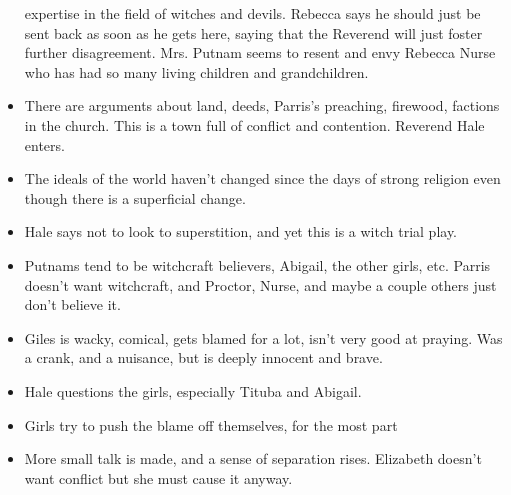 \documentclass[10pt]{article}
\begin{document}
\begin{itemize}
		expertise in the field of witches and devils.  Rebecca says he
		should just be sent back as soon as he gets here, saying that the
		Reverend will just foster further disagreement.  Mrs. Putnam seems
		to resent and envy Rebecca Nurse who has had so many living children
		and grandchildren.
	\item There are arguments about land, deeds, Parris's preaching,
		firewood, factions in the church.  This is a town full of conflict
		and contention.  Reverend Hale enters.
	\item The ideals of the world haven't changed since the days of strong
		religion even though there is a superficial change.
	\item Hale says not to look to superstition, and yet this is a witch
		trial play.
	\item Putnams tend to be witchcraft believers, Abigail, the other girls,
		etc.  Parris doesn't want witchcraft, and Proctor, Nurse, and maybe
		a couple others just don't believe it.
	\item Giles is wacky, comical, gets blamed for a lot, isn't very good
		at praying.  Was a crank, and a nuisance, but is deeply innocent and
		brave.
	\item Hale questions the girls, especially Tituba and Abigail.  
	\item Girls try to push the blame off themselves, for the most part
	\item More small talk is made, and a sense of separation rises.  
		Elizabeth doesn't want conflict but she must cause it anyway.
\end{itemize}
\end{document}
